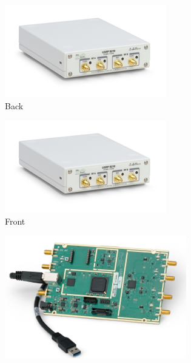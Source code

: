\documentclass[12pt]{report}
\begin{document}
            \begin{figure}[h]
                \centering
                \begin{subfigure}{0.3\linewidth}
                    \includegraphics[width=\linewidth]{USRPback.png}
                    \caption{Back}
                    \label{img:USRPback}
                \end{subfigure}
                \begin{subfigure}{0.3\linewidth}
                    \includegraphics[width=\linewidth]{USRPback.png}
                    \caption{Front}
                    \label{img:USRPfront}
                \end{subfigure}
                \begin{subfigure}{0.3\linewidth}
                        \includegraphics[width=\linewidth]{USRPin.png}

\end{subfigure}
\end{figure}
\end{document}
